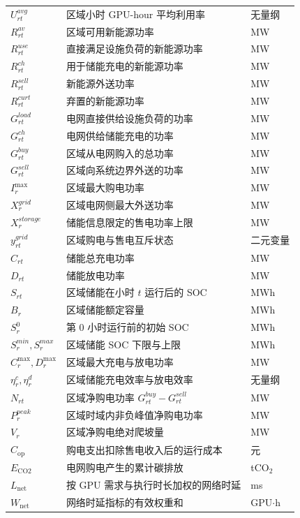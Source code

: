 \documentclass[withoutpreface,bwprint]{cumcmthesis}
\begin{document}
{\begin{longtable}{lll}
$U_{rt}^{avg}$ & 区域小时 GPU-hour 平均利用率 & 无量纲 \\
$R_{rt}^{av}$ & 区域可用新能源功率 & MW \\
$R_{rt}^{use}$ & 直接满足设施负荷的新能源功率 & MW \\
$R_{rt}^{ch}$ & 用于储能充电的新能源功率 & MW \\
$R_{rt}^{sell}$ & 新能源外送功率 & MW \\
$R_{rt}^{curt}$ & 弃置的新能源功率 & MW \\
$G_{rt}^{load}$ & 电网直接供给设施负荷的功率 & MW \\
$G_{rt}^{ch}$ & 电网供给储能充电的功率 & MW \\
$G_{rt}^{buy}$ & 区域从电网购入的总功率 & MW \\
$G_{rt}^{sell}$ & 区域向系统边界外送的功率 & MW \\
$I_r^{\max}$ & 区域最大购电功率 & MW \\
$X_r^{grid}$ & 区域电网侧最大外送功率 & MW \\
$X_r^{storage}$ & 储能信息限定的售电功率上限 & MW \\
$y_{rt}^{grid}$ & 区域购电与售电互斥状态 & 二元变量 \\
$C_{rt}$ & 储能总充电功率 & MW \\
$D_{rt}$ & 储能放电功率 & MW \\
$S_{rt}$ & 区域储能在小时 $t$ 运行后的 SOC & MWh \\
$B_r$ & 区域储能额定容量 & MWh \\
$S_r^0$ & 第 $0$ 小时运行前的初始 SOC & MWh \\
$S_r^{min},S_r^{max}$ & 区域储能 SOC 下限与上限 & MWh \\
$C_r^{\max},D_r^{\max}$ & 区域最大充电与放电功率 & MW \\
$\eta_r^c,\eta_r^d$ & 区域储能充电效率与放电效率 & 无量纲 \\
$N_{rt}$ & 区域净购电功率 $G_{rt}^{buy}-G_{rt}^{sell}$ & MW \\
$P_r^{peak}$ & 区域时域内非负峰值净购电功率 & MW \\
$V_r$ & 区域净购电绝对爬坡量 & MW \\
$C_{\mathrm{op}}$ & 购电支出扣除售电收入后的运行成本 & 元 \\
$E_{\mathrm{CO2}}$ & 电网购电产生的累计碳排放 & tCO$_2$ \\
$L_{\mathrm{net}}$ & 按 GPU 需求与执行时长加权的网络时延 & ms \\
$W_{\mathrm{net}}$ & 网络时延指标的有效权重和 & GPU$\cdot$h \\

\end{longtable}}
\end{document}
